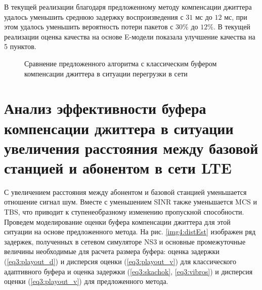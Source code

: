 В текущей реализации благодаря предложенному методу компенсации джиттера удалось уменьшить среднюю задержку воспроизведения с $31$ мс до $12$ мс, при этом удалось уменьшить вероятность потери пакетов с $30\%$ до $12\%$.
В текущей реализации оценка качества на основе E-модели показала улучшение качества на 5 пунктов.



\pgfplotsset{width=15cm, height=10cm, compat=1.3}
\begin{figure} [!ht]
  \center
{}
\caption{Сравнение предложенного алгоритма с классическим буфером компенсации джиттера в ситуации перегрузки в сети}
  \label{img4:congBuff}
\end{figure}














\section{Анализ эффективности буфера компенсации джиттера в ситуации увеличения расстояния между базовой станцией и абонентом в сети LTE} \label{sect4}

С увеличением расстояния между абонентом и базовой станцией уменьшается отношение сигнал шум. Вместе с уменьшением SINR также уменьшается MCS и TBS, что приводит к ступенеобразному изменению пропускной способности.
Проведем моделирование оценки буфера компенсации джиттера для этой ситуации на основе предложенного метода.
На рис. \ref{img4:distEst} изображен ряд задержек, полученных в сетевом симуляторе NS3 и основные промежуточные величины необходимые для расчета размера буфера: 
оценка задержки (\ref{eq3:playout_d}) и дисперсия оценки (\ref{eq3:playout_v}) для классического адаптивного буфера \cite{Ramjee} и 
оценка задержки (\ref{eq3:skachok}, \ref{eq3:vibros}) и дисперсия оценки (\ref{eq3:playout_v}) для предложенного метода.


